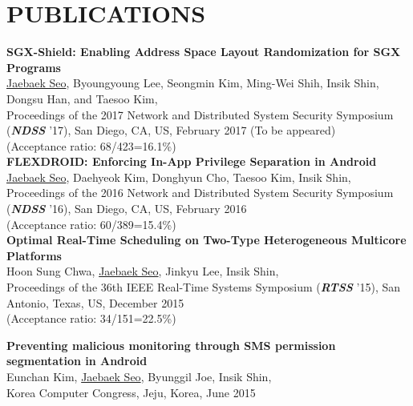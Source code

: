 \section{PUBLICATIONS}
   \vspace{0.1in}


    \textbf{SGX-Shield: Enabling Address Space Layout Randomization for SGX Programs}\\
    \underline{Jaebaek Seo}, Byoungyoung Lee, Seongmin Kim, Ming-Wei Shih,
    Insik Shin, Dongsu Han, and Taesoo Kim,\\
    Proceedings of the 2017 Network and Distributed System Security Symposium (\emph{\textbf{NDSS}} '17),
    San Diego, CA, US, February 2017 (To be appeared)\\
    {\small(Acceptance ratio: 68/423=16.1\%)}\\

    \textbf{FLEXDROID: Enforcing In-App Privilege Separation in Android}\\
    \underline{Jaebaek Seo}, Daehyeok Kim, Donghyun Cho, Taesoo Kim, Insik Shin,\\
    Proceedings of the 2016 Network and Distributed System Security Symposium (\emph{\textbf{NDSS}} '16),
    San Diego, CA, US, February 2016\\
    {\small(Acceptance ratio: 60/389=15.4\%)}\\

    \textbf{Optimal Real-Time Scheduling on Two-Type Heterogeneous Multicore Platforms}\\
    Hoon Sung Chwa, \underline{Jaebaek Seo}, Jinkyu Lee, Insik Shin,\\
    Proceedings of the 36th IEEE Real-Time Systems Symposium (\emph{\textbf{RTSS}} '15),
    San Antonio, Texas, US, December 2015\\
    {\small(Acceptance ratio: 34/151=22.5\%)}

    \textbf{Preventing malicious monitoring through SMS permission segmentation in Android}\\
    Eunchan Kim, \underline{Jaebaek Seo}, Byunggil Joe, Insik Shin,\\
    Korea Computer Congress, Jeju, Korea, June 2015
